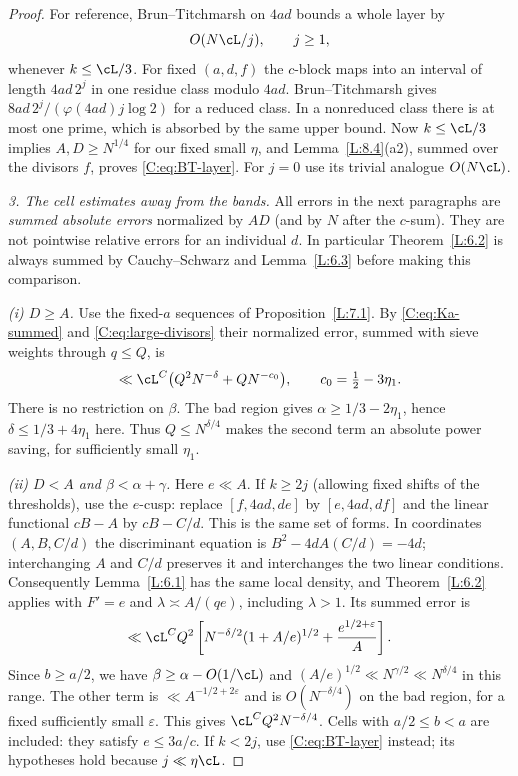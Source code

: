 \begin{proof}
For reference, Brun--Titchmarsh on $4ad$ bounds a whole layer by
\begin{equation}\label{C:eq:BT-layer}
 O(N\cL/j),\qquad j\geq1,
\end{equation}
whenever $k\leq\cL/3$.  For fixed $(a,d,f)$ the $c$-block maps into
an interval of length $4ad\,2^j$ in one residue class modulo $4ad$.
Brun--Titchmarsh \cite[(A.10)]{ET} gives
$8ad\,2^j/(\varphi(4ad)j\log2)$ for a reduced class.  In a
nonreduced class there is at most one prime, which is absorbed by the
same upper bound.  Now $k\leq\cL/3$ implies $A,D\geq N^{1/4}$ for
our fixed small $\eta$, and Lemma~\ref{L:8.4}(a2), summed over the
divisors $f$, proves \eqref{C:eq:BT-layer}.  For $j=0$ use its trivial
analogue $O(N\cL)$.

\smallskip\noindent
\emph{3. The cell estimates away from the bands.}
All errors in the next paragraphs are \emph{summed absolute errors}
normalized by $AD$ (and by $N$ after the $c$-sum).  They are not
pointwise relative errors for an individual $d$.  In particular
Theorem~\ref{L:6.2} is always summed by Cauchy--Schwarz and
Lemma~\ref{L:6.3} before making this comparison.

\emph{(i) $D\geq A$.}
Use the fixed-$a$ sequences of Proposition~\ref{L:7.1}.
By \eqref{C:eq:Ka-summed} and \eqref{C:eq:large-divisors} their
normalized error, summed with sieve weights through $q\leq Q$, is
\[
 \ll\cL^C\bigl(Q^2N^{-\delta}+QN^{-c_0}\bigr),
 \qquad c_0=\tfrac12-3\eta_1.
\]
There is no restriction on $\beta$.  The bad region gives
$\alpha\geq1/3-2\eta_1$, hence $\delta\leq1/3+4\eta_1$ here.
Thus $Q\leq N^{\delta/4}$ makes the second term an absolute power
saving, for sufficiently small $\eta_1$.

\emph{(ii) $D<A$ and $\beta<\alpha+\gamma$.}
Here $e\ll A$.  If $k\geq2j$ (allowing fixed shifts of the thresholds),
use the $e$-cusp: replace $[f,4ad,de]$ by $[e,4ad,df]$ and the linear
functional $cB-A$ by $cB-C/d$.  This is the same set of forms.
In coordinates $(A,B,C/d)$ the discriminant equation is
$B^2-4dA(C/d)=-4d$; interchanging $A$ and $C/d$ preserves it and
interchanges the two linear conditions.  Consequently
Lemma~\ref{L:6.1} has the same local density, and
Theorem~\ref{L:6.2} applies with $F'=e$ and
$\lambda\asymp A/(qe)$, including $\lambda>1$.
Its summed error is
\begin{equation}\label{C:eq:e-cusp}
 \ll\cL^C Q^2
 \left[N^{-\delta/2}(1+A/e)^{1/2}
       +\frac{e^{1/2+\varepsilon}}A\right].
\end{equation}
Since $b\geq a/2$, we have $\beta\geq\alpha-O(1/\cL)$ and
$(A/e)^{1/2}\ll N^{\gamma/2}\ll N^{\delta/4}$ in this range.
The other term is $\ll A^{-1/2+2\varepsilon}$ and is
$O(N^{-\delta/4})$ on the bad region, for a fixed sufficiently small
$\varepsilon$.  This gives $\cL^CQ^2N^{-\delta/4}$.
Cells with $a/2\leq b<a$ are included: they satisfy $e\leq3a/c$.
If $k<2j$, use \eqref{C:eq:BT-layer} instead; its hypotheses hold
because $j\ll\eta\cL$.


\end{proof}
